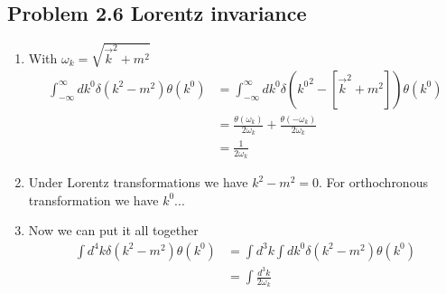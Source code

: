 \documentclass[../main.tex]{subfiles}
\begin{document}
\subsection{Problem 2.6 Lorentz invariance}
\begin{enumerate}
    \item With $\omega_k=\sqrt{\vec{k}^2+m^2}$
    \begin{align}
        \int_{-\infty}^\infty dk^0\delta(k^2-m^2)\theta(k^0)
        &=\int_{-\infty}^\infty dk^0\delta({k^0}^2-[\vec{k}^2+m^2])\theta(k^0)\\
        &=\frac{\theta(\omega_k)}{2\omega_k}+\frac{\theta(-\omega_k)}{2\omega_k}\\
        &=\frac{1}{2\omega_k}
    \end{align}
    \item Under Lorentz transformations we have $k^2-m^2=0$. For orthochronous transformation we have $k^0 ...$
    \item Now we can put it all together
    \begin{align}
        \int d^4k\delta(k^2-m^2)\theta(k^0)
        &=\int d^3k\int dk^0\delta(k^2-m^2)\theta(k^0)\\
        &=\int\frac{d^3k}{2\omega_k}
    \end{align}
\end{enumerate}
\end{document}
